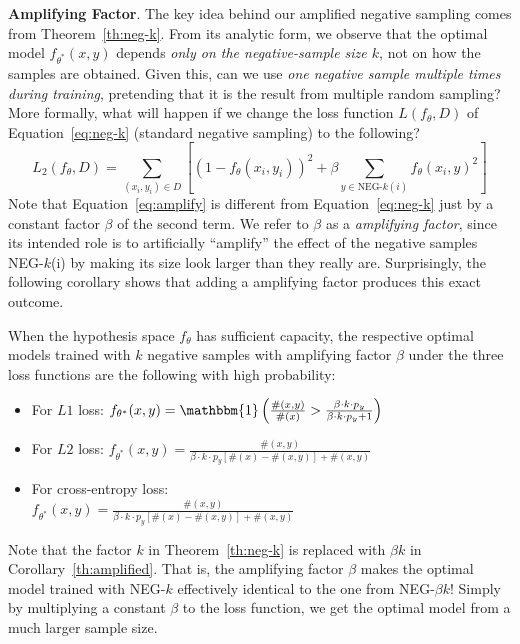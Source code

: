 \textbf{Amplifying Factor}.
The key idea behind our amplified negative sampling comes from Theorem~\ref{th:neg-k}. From its analytic form, we observe that the optimal model $f_{\theta^*}(x,y)$ depends \emph{only on the negative-sample size $k$}, not on how the samples are obtained. Given this, can we use \emph{one negative sample multiple times during training}, pretending that it is the result from multiple random sampling? More formally, what will happen if we change the loss function $L(f_{\theta},D)$ of Equation~\ref{eq:neg-k} (standard negative sampling) to the following?
\small
\begin{equation}
L_2(f_{\theta},D)\!=
\!\!\!\!\!\!\!\sum_{(x_i,y_i)\in D}\!\!\left[(1 - f_{\theta}(x_i, y_i))^2 + 
\beta\!\!\!\!\!\!\!\sum_{y \in \text{NEG-$k$}(i)}\!\!\!\!\!\!\! f_{\theta}(x_i, y)^2 \right]
\label{eq:amplify}
\end{equation}
\normalsize
Note that Equation~\ref{eq:amplify} is different from Equation~\ref{eq:neg-k} just by a constant factor $\beta$ of the second term. We refer to $\beta$ as a \emph{amplifying factor}, since its intended role is to artificially ``amplify'' the effect of the negative samples NEG-$k$(i) by making its size look larger than they really are. %
Surprisingly, the following corollary shows that adding a amplifying factor produces this exact outcome.
\begin{corollary}\label{th:amplified}
	When the hypothesis space $f_{\theta}$ has sufficient capacity,
	the respective optimal models trained with $k$ negative samples with amplifying factor $\beta$ under the three loss functions are the following with high probability:
	\small
	\begin{itemize}
		\setlength\itemsep{-0.2em}
		\item For $L1$ loss: $f_{\theta^*}(x,y) = \mathbbm{1}\left(\frac{\#(x,y)}{\#(x)} > \frac{\beta \cdot k \cdot p_y}{\beta \cdot k \cdot p_y + 1}\right)$
		\item For $L2$ loss:  $f_{\theta^*}(x,y) = \frac{\#(x,y)}{\beta \cdot k \cdot p_y [\#(x)- \#(x,y)] + \#(x,y)}$
		\item For cross-entropy loss:\\ 
		$f_{\theta^*}(x,y) = \frac{\#(x,y)}{\beta \cdot k \cdot p_y [\#(x)- \#(x,y)] + \#(x,y)}$
	\end{itemize}
	\normalsize
\end{corollary}
Note that the factor $k$ in Theorem~\ref{th:neg-k} is replaced with $\beta k$ in Corollary~\ref{th:amplified}. That is, the amplifying factor $\beta$ makes the optimal model trained with NEG-$k$ effectively identical to the one from NEG-$\beta k$! Simply by multiplying a constant $\beta$ to the loss function, we get the optimal model from a much larger sample size. 

